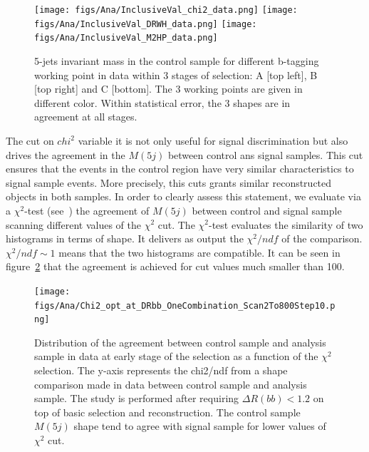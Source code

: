 \begin{figure}[!Hhtbp]
  \begin{center}
    \texttt{[image: figs/Ana/InclusiveVal\_chi2\_data.png]}
    \texttt{[image: figs/Ana/InclusiveVal\_DRWH\_data.png]}
    \texttt{[image: figs/Ana/InclusiveVal\_M2HP\_data.png]}
    \caption{5-jets invariant mass in the control sample for different b-tagging working point in data within 3 stages of selection: A [top left], B [top right] and C [bottom]. The 3 working points are given in different color. Within statistical error, the 3 shapes are in agreement at all stages.}
    \label{fig:StageWPData}
  \end{center}
\end{figure}

The cut on $chi^{2}$ variable it is not only useful for signal discrimination but also drives the agreement in the $M(5j)$ between control ans signal samples. This cut ensures that the events in the control region have very similar characteristics to signal sample events. More precisely, this cuts grants similar reconstructed objects in both samples. In order to clearly assess this statement, we evaluate via a $\chi^{2}$-test (see~\cite{2006physics...5123G}) the agreement of $M(5j)$ between control and signal sample scanning different values of the $\chi^{2}$ cut. The $\chi^{2}$-test evaluates the similarity of two histograms in terms of shape. It delivers as output the $\chi^{2}/ndf$ of the comparison. $\chi^{2}/ndf\sim 1$ means that the two histograms are compatible. It can be seen in figure~\ref{fig:optchi2} that the agreement is achieved for cut values much smaller than 100. 

\begin{figure}[!Hhtbp]
  \begin{center}
    \texttt{[image: figs/Ana/Chi2\_opt\_at\_DRbb\_OneCombination\_Scan2To800Step10.png]}
    \caption{Distribution of the agreement between control sample and analysis sample in data at early stage of the selection as a function of the $\chi^2$ selection. The y-axis represents the chi2/ndf from a shape comparison made in data between control sample and analysis sample. The study is performed after requiring $\Delta R(bb) <1.2$ on top of basic selection and reconstruction. The control sample $M(5j)$ shape tend to agree with signal sample for lower values of $\chi^2$ cut.}
    \label{fig:optchi2}
  \end{center}
\end{figure}

